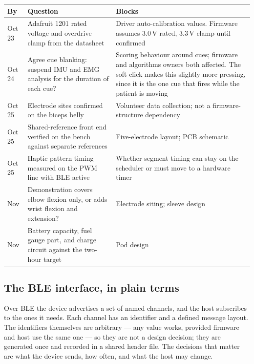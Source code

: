 \documentclass[11pt]{article}
\begin{document}
\begin{table}[H]
\centering\small
\begin{tabularx}{\linewidth}{@{}p{13mm} p{62mm} X@{}}
\toprule
\textbf{By} & \textbf{Question} & \textbf{Blocks} \\
\midrule
Oct 23 & Adafruit 1201 rated voltage and overdrive clamp from the datasheet & Driver auto-calibration values. Firmware assumes 3.0\,V rated, 3.3\,V clamp until confirmed \\
Oct 24 & Agree cue blanking: suspend IMU and EMG analysis for the duration of each cue? & Scoring behaviour around cues; firmware and algorithms owners both affected. The soft click makes this slightly more pressing, since it is the one cue that fires while the patient is moving \\
Oct 25 & Electrode sites confirmed on the biceps belly & Volunteer data collection; not a firmware-structure dependency \\
Oct 25 & Shared-reference front end verified on the bench against separate references & Five-electrode layout; PCB schematic \\
Oct 25 & Haptic pattern timing measured on the PWM line with BLE active & Whether segment timing can stay on the scheduler or must move to a hardware timer \\
Nov & Demonstration covers elbow flexion only, or adds wrist flexion and extension? & Electrode siting; sleeve design \\
Nov & Battery capacity, fuel gauge part, and charge circuit against the two-hour target & Pod design \\
\bottomrule
\end{tabularx}
\end{table}

\subsection{The BLE interface, in plain terms}

Over BLE the device advertises a set of named channels, and the host subscribes
to the ones it needs. Each channel has an identifier and a defined message
layout. The identifiers themselves are arbitrary --- any value works, provided
firmware and host use the same one --- so they are not a design decision; they
are generated once and recorded in a shared header file. The decisions that
matter are what the device sends, how often, and what the host may change.
\end{document}
